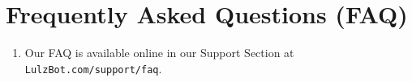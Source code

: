 %
%
%
%
%

\section{Frequently Asked Questions (FAQ)}
\begin{enumerate}
\item Our FAQ is available online in our Support Section at \texttt{LulzBot.com/support/faq}.
\end{enumerate}
